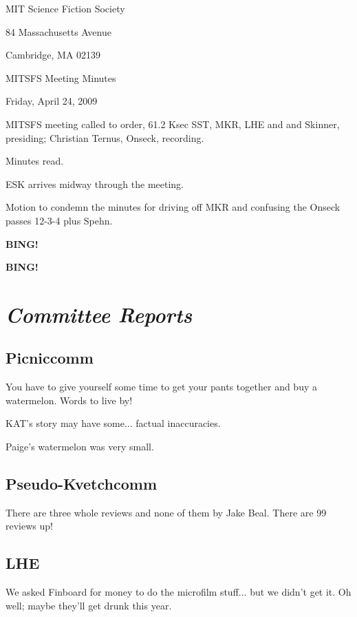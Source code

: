 \documentclass[10pt]{article}
\newcommand{\bing}{{\bf BING!} }
\newcommand{\goto}[1]{\bing \vskip 12pt \section*{{\em{#1}}}}
\newcommand{\ps}{ plus Spehn\xspace}
\begin{document}
\begin{center}

MIT Science Fiction Society

84 Massachusetts Avenue

Cambridge, MA 02139

\vspace{12pt}

MITSFS Meeting Minutes

Friday, April 24, 2009

\end{center}

\vspace{18pt}

\setlength{\parskip}{6pt}

\noindent
MITSFS meeting called to order, 61.2 Ksec SST,
MKR, LHE and and Skinner, presiding; Christian Ternus, Onseck, recording.

Minutes read.

ESK arrives midway through the meeting.

Motion to condemn the minutes for driving off MKR and confusing the Onseck passes 12-3-4\ps.

\bing

\goto{Committee Reports}

\subsection*{Picniccomm}

You have to give yourself some time to get your pants together and buy a watermelon.  Words to live by!

KAT's story may have some... factual inaccuracies.

Paige's watermelon was very small.

\subsection*{Pseudo-Kvetchcomm}

There are three whole reviews and none of them by Jake Beal.  There are 99 reviews up!

\subsection*{LHE}

We asked Finboard for money to do the microfilm stuff... but we didn't
get it.  Oh well; maybe they'll get drunk this year.
\end{document}

